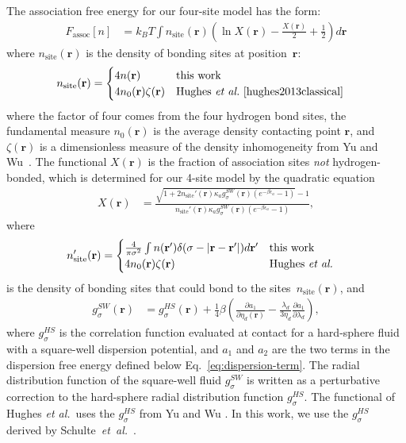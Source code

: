 \documentclass[twocolumn,amsmath,amssymb,prl]{revtex4-1}
\newcommand{\rr}{\textbf{r}}
\newcommand{\xx}{\textbf{r}}
\newcommand\etadisp{\ensuremath{\eta_\textit{d}}}
\newcommand\epsilonassoc{\ensuremath{\epsilon_\textit{a}}}
\newcommand\kappaassoc{\ensuremath{\kappa_\textit{a}}}
\newcommand\lambdadisp{\ensuremath{\lambda_\textit{d}}}
\newcommand\hughesetal{Hughes \emph{et al.}}
\newcommand\hughesetalcite{Hughes \emph{et al.}~\cite{hughes2013classical}}
\begin{document}
The association free energy for our four-site model has the form:
\begin{align}
  F_\text{assoc}[n] &= k_BT \int n_\text{site}(\xx)
  \left(\ln X(\xx) - \frac{X(\xx)}{2} + \frac12\right) d\xx
\end{align}
where $n_\text{site}(\rr)$ is the density of bonding sites at
position~$\rr$:
\begin{align}
  n_\text{site}(\rr) &=
  \begin{cases}
    4 n(\rr) & \text{this work}\\
    4 n_0(\rr) \zeta(\rr) & \text{\hughesetalcite}
  \end{cases}
\end{align}
where the factor of four comes from the four hydrogen bond sites, the
fundamental measure $n_0(\rr)$ is the average density contacting point
$\rr$, and $\zeta(\xx)$ is a dimensionless measure of the density
inhomogeneity from Yu and
Wu~\cite{yu2002fmt-dft-inhomogeneous-associating}.  The functional
$X(\rr)$ is the fraction of association sites \emph{not}
hydrogen-bonded, which is determined for our 4-site model by the
quadratic equation
\begin{align}
  X(\xx) &= \frac{\sqrt{1 + 2n_\text{site}'(\rr)
      \kappaassoc g^\textit{SW}_\sigma(\xx)
  \left(e^{-\beta\epsilonassoc} - 1\right)} - 1}
  {n_\text{site}'(\rr)
    \kappaassoc g^\textit{SW}_\sigma(\xx)
  \left(e^{-\beta\epsilonassoc} - 1\right)}, \label{eq:X}
\end{align}
where
\begin{align}
  n_\text{site}'(\rr) &=
  \begin{cases}
    \frac{4}{\pi\sigma^2} \int n(\rr')\delta(\sigma - |\rr-\rr'|) d\rr' & \text{this work}\\
    4 n_0(\rr) \zeta(\rr) & \text{\hughesetal}
  \end{cases} 
\end{align}
is the density of bonding sites that could bond to the sites~$n_\text{site}(\rr)$, and
\begin{align}
  g^\textit{SW}_\sigma(\xx) &= g^\textit{HS}_\sigma(\xx) +
  \frac{1}{4}\beta\left(\frac{\partial a_1}{\partial \etadisp(\xx)} -
  \frac{\lambdadisp}{3 \etadisp}\frac{\partial a_1}{\partial \lambdadisp}\right)\label{eq:gSW},
\end{align}
where $g^\textit{HS}_\sigma$ is the correlation function evaluated at
contact for a hard-sphere fluid with a square-well dispersion
potential, and $a_1$ and $a_2$ are the two terms in the dispersion
free energy defined below Eq.~\ref{eq:dispersion-term}.  The radial distribution function of the square-well
fluid $g^\textit{SW}_\sigma$ is written as a perturbative correction
to the hard-sphere radial distribution function
$g^\textit{HS}_\sigma$.  The functional of \hughesetal\ uses the
$g_\sigma^\textit{HS}$ from Yu and Wu
\cite{yu2002fmt-dft-inhomogeneous-associating}.  In this work, we use
the $g_\sigma^\textit{HS}$ derived by Schulte~\emph{et~al.}~\cite{schulte2012using}.
\end{document}
